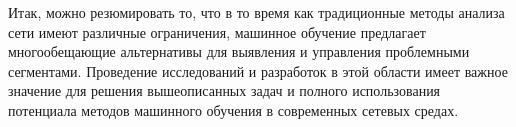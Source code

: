 Итак, можно резюмировать то, что в то время как традиционные методы анализа  сети имеют различные ограничения, машинное обучение предлагает многообещающие альтернативы для выявления и управления проблемными сегментами. Проведение исследований и разработок в этой области имеет важное значение для решения вышеописанных задач и полного использования потенциала методов машинного обучения в современных сетевых средах.

